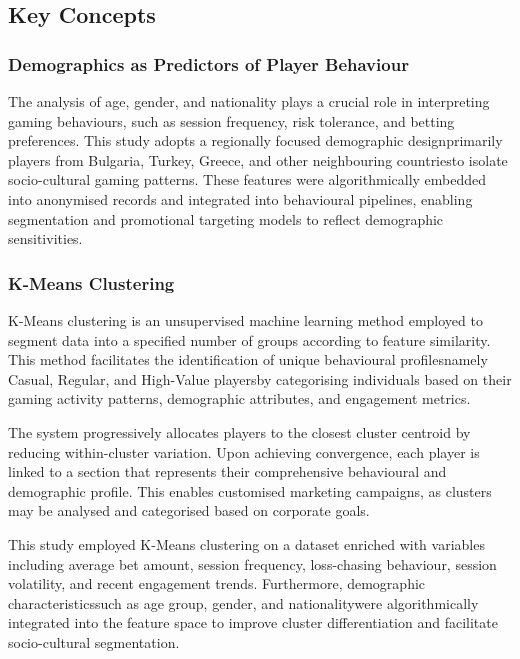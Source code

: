 \documentclass[12pt,a4paper]{report}
\begin{document}
\subsection{Key Concepts}
\subsubsection{Demographics as Predictors of Player Behaviour}

The analysis of age, gender, and nationality plays a crucial role in interpreting gaming behaviours, such as session frequency, risk tolerance, and betting preferences. This study adopts a regionally focused demographic designprimarily players from Bulgaria, Turkey, Greece, and other neighbouring countriesto isolate socio-cultural gaming patterns. These features were algorithmically embedded into anonymised records and integrated into behavioural pipelines, enabling segmentation and promotional targeting models to reflect demographic sensitivities.



\subsubsection{K-Means Clustering}

K-Means clustering is an unsupervised machine learning method employed to segment data into a specified number of groups according to feature similarity.  This method facilitates the identification of unique behavioural profilesnamely Casual, Regular, and High-Value playersby categorising individuals based on their gaming activity patterns, demographic attributes, and engagement metrics.

 The system progressively allocates players to the closest cluster centroid by reducing within-cluster variation.  Upon achieving convergence, each player is linked to a section that represents their comprehensive behavioural and demographic profile.  This enables customised marketing campaigns, as clusters may be analysed and categorised based on corporate goals.

 This study employed K-Means clustering on a dataset enriched with variables including average bet amount, session frequency, loss-chasing behaviour, session volatility, and recent engagement trends.  Furthermore, demographic characteristicssuch as age group, gender, and nationalitywere algorithmically integrated into the feature space to improve cluster differentiation and facilitate socio-cultural segmentation.
\end{document}
